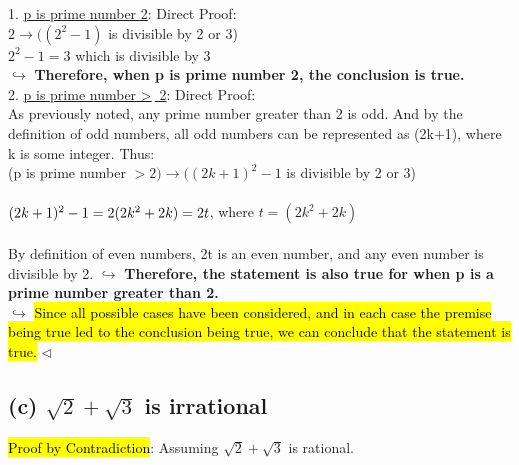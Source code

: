\documentclass[a4paper, 12pt]{article}
\begin{document}
1. \underline{p is prime number 2}: Direct Proof: \\

$2 \rightarrow ((2^2-1)$ is divisible by 2 or 3)\\
$2^2-1 = 3$ which is divisible by 3\\
$\hookrightarrow$ \textbf{Therefore, when p is prime number 2, the conclusion is true.}\\

2. \underline{p is prime number \textgreater $\:$ 2}: Direct Proof:\\

As previously noted, any prime number greater than 2 is odd. And by the definition of odd numbers, all odd numbers can be represented as (2k+1), where k is some integer. Thus:\\
(p is prime number $> 2) \rightarrow ((2k+1)^2-1$ is divisible by 2 or 3)\\
\\
$(2k+1)^2-1\\
 = 2(2k^2+2k)\\
 = 2t$, where $t = (2k^2 + 2k)$\\\\
By definition of even numbers, 2t is an even number, and any even number is divisible by 2.
$\hookrightarrow$ \textbf{Therefore, the statement is also true for when p is a prime number greater than 2.}\\

$\hookrightarrow$ \hl{Since all possible cases have been considered, and in each case the premise being true led to the conclusion being true, we can conclude that the statement is true.} $\lhd$

\subsection*{(c) $\sqrt 2 + \sqrt 3$ is irrational}

\hl{Proof by Contradiction}: Assuming $\sqrt 2 + \sqrt 3$ is rational.\\
\end{document}
